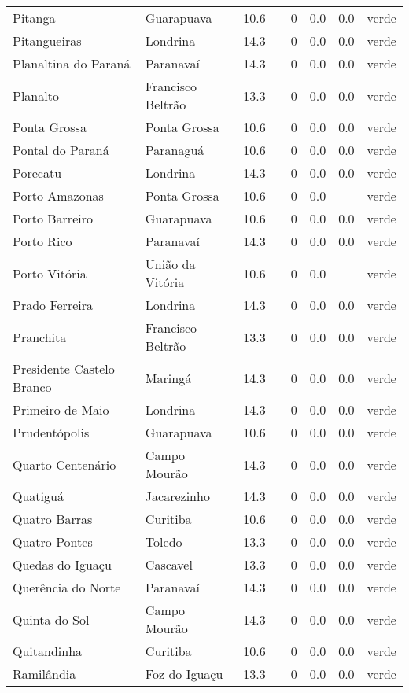 \begin{longtable}{l|lllllll}
  Pitanga & Guarapuava & 10.6 &  & 0 & 0.0 & 0.0 & verde \\ 
  Pitangueiras & Londrina & 14.3 &  & 0 & 0.0 & 0.0 & verde \\ 
  Planaltina do Paraná & Paranavaí & 14.3 &  & 0 & 0.0 & 0.0 & verde \\ 
  Planalto & Francisco Beltrão & 13.3 &  & 0 & 0.0 & 0.0 & verde \\ 
  Ponta Grossa & Ponta Grossa & 10.6 &  & 0 & 0.0 & 0.0 & verde \\ 
  Pontal do Paraná & Paranaguá & 10.6 &  & 0 & 0.0 & 0.0 & verde \\ 
  Porecatu & Londrina & 14.3 &  & 0 & 0.0 & 0.0 & verde \\ 
  Porto Amazonas & Ponta Grossa & 10.6 &  & 0 & 0.0 &  & verde \\ 
  Porto Barreiro & Guarapuava & 10.6 &  & 0 & 0.0 & 0.0 & verde \\ 
  Porto Rico & Paranavaí & 14.3 &  & 0 & 0.0 & 0.0 & verde \\ 
  Porto Vitória & União da Vitória & 10.6 &  & 0 & 0.0 &  & verde \\ 
  Prado Ferreira & Londrina & 14.3 &  & 0 & 0.0 & 0.0 & verde \\ 
  Pranchita & Francisco Beltrão & 13.3 &  & 0 & 0.0 & 0.0 & verde \\ 
  Presidente Castelo Branco & Maringá & 14.3 &  & 0 & 0.0 & 0.0 & verde \\ 
  Primeiro de Maio & Londrina & 14.3 &  & 0 & 0.0 & 0.0 & verde \\ 
  Prudentópolis & Guarapuava & 10.6 &  & 0 & 0.0 & 0.0 & verde \\ 
  Quarto Centenário & Campo Mourão & 14.3 &  & 0 & 0.0 & 0.0 & verde \\ 
  Quatiguá & Jacarezinho & 14.3 &  & 0 & 0.0 & 0.0 & verde \\ 
  Quatro Barras & Curitiba & 10.6 &  & 0 & 0.0 & 0.0 & verde \\ 
  Quatro Pontes & Toledo & 13.3 &  & 0 & 0.0 & 0.0 & verde \\ 
  Quedas do Iguaçu & Cascavel & 13.3 &  & 0 & 0.0 & 0.0 & verde \\ 
  Querência do Norte & Paranavaí & 14.3 &  & 0 & 0.0 & 0.0 & verde \\ 
  Quinta do Sol & Campo Mourão & 14.3 &  & 0 & 0.0 & 0.0 & verde \\ 
  Quitandinha & Curitiba & 10.6 &  & 0 & 0.0 & 0.0 & verde \\ 
  Ramilândia & Foz do Iguaçu & 13.3 &  & 0 & 0.0 & 0.0 & verde \\ 

\end{longtable}
